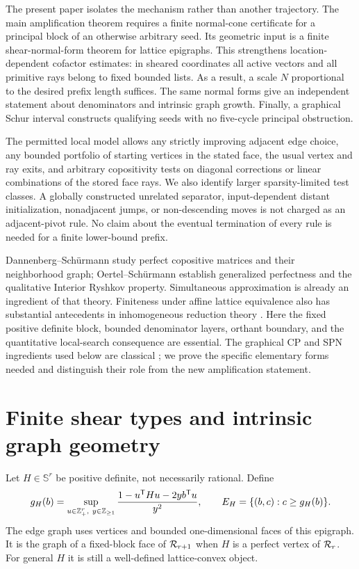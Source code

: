 \documentclass[11pt]{article}
\theoremstyle{definition}\newtheorem{definition}[theorem]{Definition}
\theoremstyle{remark}\newtheorem{remark}[theorem]{Remark}
\newcommand{\T}{^{\mathsf T}}\newcommand{\norm}[1]{\lVert #1\rVert}
\begin{document}
The present paper isolates the mechanism rather than another trajectory. The main amplification theorem requires a finite normal-cone certificate for a principal block of an otherwise arbitrary seed. Its geometric input is a finite shear-normal-form theorem for lattice epigraphs. This strengthens location-dependent cofactor estimates: in sheared coordinates all active vectors and all primitive rays belong to fixed bounded lists. As a result, a scale $N$ proportional to the desired prefix length suffices. The same normal forms give an independent statement about denominators and intrinsic graph growth. Finally, a graphical Schur interval constructs qualifying seeds with no five-cycle principal obstruction.

The permitted local model allows any strictly improving adjacent edge choice, any bounded portfolio of starting vertices in the stated face, the usual vertex and ray exits, and arbitrary copositivity tests on diagonal corrections or linear combinations of the stored face rays. We also identify larger sparsity-limited test classes. A globally constructed unrelated separator, input-dependent distant initialization, nonadjacent jumps, or non-descending moves is not charged as an adjacent-pivot rule. No claim about the eventual termination of every rule is needed for a finite lower-bound prefix.

Dannenberg--Sch\"urmann \cite{DS} study perfect copositive matrices and their neighborhood graph; Oertel--Sch\"urmann \cite{OS} establish generalized perfectness and the qualitative Interior Ryshkov property. Simultaneous approximation is already an ingredient of that theory. Finiteness under affine lattice equivalence also has substantial antecedents in inhomogeneous reduction theory \cite{Inhom}. Here the fixed positive definite block, bounded denominator layers, orthant boundary, and the quantitative local-search consequence are essential. The graphical CP and SPN ingredients used below are classical \cite{Drew,Barioli,SPN}; we prove the specific elementary forms needed and distinguish their role from the new amplification statement.

\section{Finite shear types and intrinsic graph geometry}
Let $H\in\mathbb S^r$ be positive definite, not necessarily rational. Define
\[
 g_H(b)=\sup_{u\in\Z_+^r,\ y\in\Z_{\ge1}}
 \frac{1-u\T Hu-2yb\T u}{y^2},\qquad
 E_H=\{(b,c):c\ge g_H(b)\}.
\]
The edge graph uses vertices and bounded one-dimensional faces of this epigraph. It is the graph of a fixed-block face of $\mathcal R_{r+1}$ when $H$ is a perfect vertex of $\mathcal R_r$. For general $H$ it is still a well-defined lattice-convex object.
\end{document}
